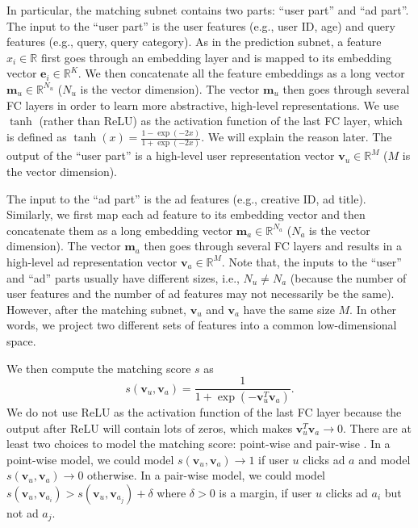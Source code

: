 \documentclass{article}
\begin{document}
In particular, the matching subnet contains two parts: ``user part'' and ``ad part''.
The input to the ``user part'' is the user features (e.g., user ID, age) and query features (e.g., query, query category).
As in the prediction subnet, a feature $x_i \in \mathbb{R}$ first goes through an embedding layer and is mapped to its embedding vector $\mathbf{e}_i \in \mathbb{R}^K$.
We then concatenate all the feature embeddings as a long vector $\mathbf{m}_u \in \mathbb{R}^{N_u}$ ($N_u$ is the vector dimension).
The vector $\mathbf{m}_u$ then goes through several FC layers in order to learn more abstractive, high-level representations. We use $\tanh$ (rather than ReLU) as the activation function of the last FC layer, which is defined as
$
\tanh(x) = \frac{1-\exp(-2x)}{1+\exp(-2x)}.
$
We will explain the reason later.
The output of the ``user part'' is a high-level user representation vector $\mathbf{v}_u \in \mathbb{R}^M$ ($M$ is the vector dimension).

The input to the ``ad part'' is the ad features (e.g., creative ID, ad title). Similarly, we first map each ad feature to its embedding vector and then concatenate them as a long embedding vector $\mathbf{m}_a \in \mathbb{R}^{N_a}$ ($N_a$ is the vector dimension).
The vector $\mathbf{m}_a$ then goes through several FC layers and results in a high-level ad representation vector $\mathbf{v}_a \in \mathbb{R}^M$.
Note that, the inputs to the ``user'' and ``ad'' parts usually have different sizes, i.e., $N_u \neq N_a$ (because the number of user features and the number of ad features may not necessarily be the same). However, after the matching subnet, $\mathbf{v}_u$ and $\mathbf{v}_a$ have the same size $M$. In other words, we project two different sets of features into a common low-dimensional space.

We then compute the matching score $s$ as
\[
s(\mathbf{v}_u, \mathbf{v}_a) = \frac{1}{1 + \exp(- \mathbf{v}_u^T \mathbf{v}_a)}.
\]
We do not use ReLU as the activation function of the last FC layer because the output after ReLU will contain lots of zeros, which makes $\mathbf{v}_u^T \mathbf{v}_a \rightarrow 0$.
There are at least two choices to model the matching score: point-wise and pair-wise \cite{liu2009learning}. In a point-wise model, we could model $s(\mathbf{v}_u, \mathbf{v}_a) \rightarrow 1$ if user $u$ clicks ad $a$ and model $s(\mathbf{v}_u, \mathbf{v}_a) \rightarrow 0$ otherwise. In a pair-wise model, we could model $s(\mathbf{v}_u, \mathbf{v}_{a_i}) > s(\mathbf{v}_u, \mathbf{v}_{a_j}) + \delta$ where $\delta >0$ is a margin, if user $u$ clicks ad $a_i$ but not ad $a_j$.
\end{document}
